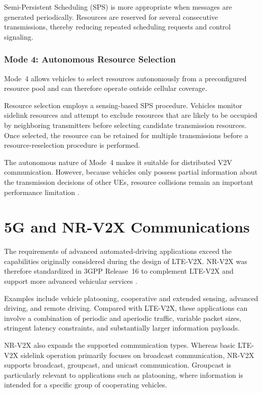 Semi-Persistent Scheduling (SPS) is more appropriate when messages are
generated periodically. Resources are reserved for several consecutive
transmissions, thereby reducing repeated scheduling requests and control
signaling.

\subsubsection{Mode 4: Autonomous Resource Selection}

Mode~4 allows vehicles to select resources autonomously from a preconfigured
resource pool and can therefore operate outside cellular coverage.

Resource selection employs a sensing-based SPS procedure. Vehicles monitor
sidelink resources and attempt to exclude resources that are likely to be
occupied by neighboring transmitters before selecting candidate transmission
resources. Once selected, the resource can be retained for multiple
transmissions before a resource-reselection procedure is performed.

The autonomous nature of Mode~4 makes it suitable for distributed V2V
communication. However, because vehicles only possess partial information
about the transmission decisions of other UEs, resource collisions remain an
important performance limitation
\cite{gonzalezmartin2018mode4,bazzi2018mode4,molinamasegosa2017mode4}.

\section{5G and NR-V2X Communications}
\label{sec:nrv2x}

The requirements of advanced automated-driving applications exceed the
capabilities originally considered during the design of LTE-V2X. NR-V2X was
therefore standardized in 3GPP Release~16 to complement LTE-V2X and support
more advanced vehicular services
\cite{3gpp38885,lien2020nr}.

Examples include vehicle platooning, cooperative and extended sensing,
advanced driving, and remote driving. Compared with LTE-V2X, these
applications can involve a combination of periodic and aperiodic traffic,
variable packet sizes, stringent latency constraints, and substantially larger
information payloads.

NR-V2X also expands the supported communication types. Whereas basic
LTE-V2X sidelink operation primarily focuses on broadcast communication,
NR-V2X supports broadcast, groupcast, and unicast communication. Groupcast is
particularly relevant to applications such as platooning, where information is
intended for a specific group of cooperating vehicles.

